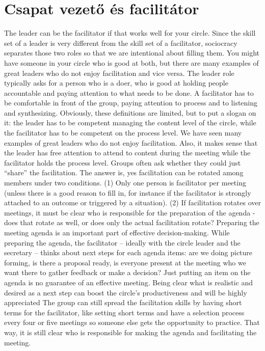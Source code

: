 \section{Csapat vezető és facilitátor}

The leader can be the facilitator if that works well for your circle. Since the skill set of a leader is very different from the skill set of a facilitator, sociocracy separates those two roles so that we are intentional about filling them. You might have someone in your circle who is good at both, but there are many examples of great leaders who do not enjoy facilitation and vice versa. The leader role typically asks for a person who is a doer, who is good at holding people accountable and paying attention to what needs to be done. A facilitator has to be comfortable in front of the group, paying attention to process and to listening and synthesizing. Obviously, these definitions are limited, but to put a slogan on it: the leader has to be competent managing the content level of the circle, while the facilitator has to be competent on the process level. We have seen many examples of great leaders who do not enjoy facilitation. Also, it makes sense that the leader has free attention to attend to content during the meeting while the facilitator holds the process level. Groups often ask whether they could just “share” the facilitation. The answer is, yes facilitation can be rotated among members under two conditions. (1) Only one person is facilitator per meeting (unless there is a good reason to fill in, for instance if the facilitator is strongly attached to an outcome or triggered by a situation). (2) If facilitation rotates over meetings, it must be clear who is responsible for the preparation of the agenda - does that rotate as well, or does only the actual facilitation rotate? Preparing the meeting agenda is an important part of effective decision-making. While preparing the agenda, the facilitator -- ideally with the circle leader and the secretary -- thinks about next steps for each agenda items: are we doing picture forming, is there a proposal ready, is everyone present at the meeting who we want there to gather feedback or make a decision? Just putting an item on the agenda is no guarantee of an effective meeting. Being clear what is realistic and desired as a next step can boost the circle’s productiveness and will be highly appreciated The group can still spread the facilitation skills by having short terms for the facilitator, like setting short terms and have a selection process every four or five meetings so someone else gets the opportunity to practice. That way, it is still clear who is responsible for making the agenda and facilitating the meeting. 
